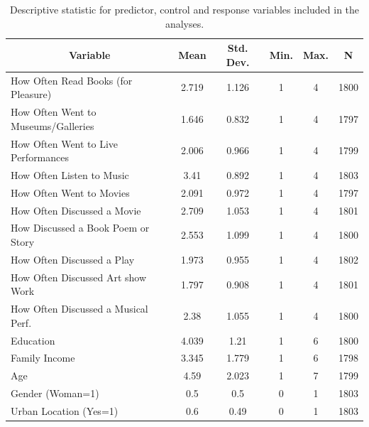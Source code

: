 
\begin{table}[ht!]\centering \caption{Descriptive statistic for predictor, control and response variables included in the analyses. \label{tab:desc}}
\begin{tabular}{l c c c c c}\hline\hline
\multicolumn{1}{c}{\textbf{Variable}} & \textbf{Mean}
 & \textbf{Std. Dev.}& \textbf{Min.} &  \textbf{Max.} & \textbf{N}\\ \hline
How Often Read Books (for Pleasure) & 2.719 & 1.126 & 1 & 4 & 1800\\
How Often Went to Museums/Galleries & 1.646 & 0.832 & 1 & 4 & 1797\\
How Often Went to Live Performances & 2.006 & 0.966 & 1 & 4 & 1799\\
How Often Listen to Music & 3.41 & 0.892 & 1 & 4 & 1803\\
How Often Went to Movies & 2.091 & 0.972 & 1 & 4 & 1797\\
How Often Discussed a Movie & 2.709 & 1.053 & 1 & 4 & 1801\\
How Discussed a Book Poem or Story & 2.553 & 1.099 & 1 & 4 & 1800\\
How Often Discussed a Play & 1.973 & 0.955 & 1 & 4 & 1802\\
How Often Discussed Art show Work & 1.797 & 0.908 & 1 & 4 & 1801\\
How Often Discussed a Musical Perf. & 2.38 & 1.055 & 1 & 4 & 1800\\
Education & 4.039 & 1.21 & 1 & 6 & 1800\\
Family Income & 3.345 & 1.779 & 1 & 6 & 1798\\
Age & 4.59 & 2.023 & 1 & 7 & 1799\\
Gender (Woman=1) & 0.5 & 0.5 & 0 & 1 & 1803\\
Urban Location (Yes=1) & 0.6 & 0.49 & 0 & 1 & 1803\\
\hline\end{tabular}
\end{table}
